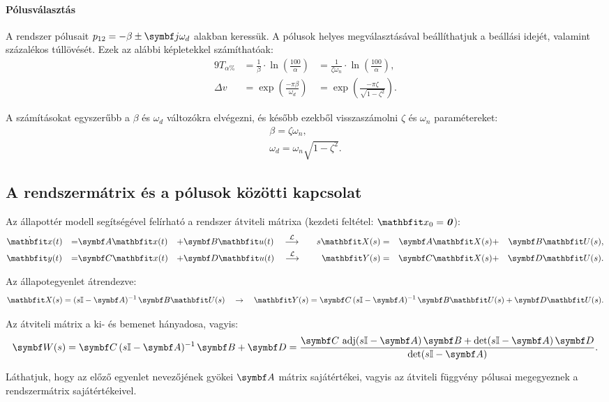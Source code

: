 \paragraph{Pólusválasztás} A rendszer pólusait $p_{12} = -\beta \pm \iu
  \omega_d$ alakban keressük. A pólusok helyes megválasztásával beállíthatjuk
a beállási idejét, valamint százalékos túllövését. Ezek az alábbi képletekkel
számíthatóak:
\begin{alignat}{9}
  T_{\alpha\%}
   & = \frac{1}{\beta} \cdot \ln \left( \frac{100}{\alpha} \right)
   & = \frac{1}{\zeta \omega_n} \cdot \ln \left( \frac{100}{\alpha} \right),
  \\[2mm]
  \Delta v
   & = \exp \left( \frac{-\pi \beta}{\omega_{d}} \right)
   & = \exp \left( \frac{-\pi \zeta}{\sqrt{1 - \zeta^2}} \right).
\end{alignat}

A számításokat egyszerűbb a $\beta$ és $\omega_d$ változókra elvégezni, és
később ezekből visszaszámolni $\zeta$ és $\omega_n$ paramétereket:
\begin{gather}
  \beta = \zeta \omega_n,
  \\
  \omega_d = \omega_n \sqrt{1 - \zeta^2}.
\end{gather}

\subsection{A rendszermátrix és a pólusok közötti kapcsolat}

Az állapottér modell segítségével felírható a rendszer átviteli mátrixa
(kezdeti feltétel: $\rvec x_0 = \nvec$):
\begin{alignat}{9}
   & \dot{\rvec x} (t) & = & \rmat A \rvec x(t) & + & \rmat B \rvec u(t)
  \quad \overset{\mathcal L}{\longrightarrow} \quad
   & s \rvec X(s)      & = & \rmat A \rvec X(s) & + & \rmat B \rvec U(s)
  ,
  \\
   & \rvec y(t)        & = & \rmat C \rvec x(t) & + & \rmat D \rvec u(t)
  \quad \overset{\mathcal L}{\longrightarrow} \quad
   & \rvec Y(s)        & = & \rmat C \rvec X(s) & + & \rmat D \rvec U(s)
  .
\end{alignat}

Az állapotegyenlet átrendezve:
\begin{equation}
  \rvec X(s) = (s\Imat - \rmat A)^{-1} \, \rmat B \rvec U(s)
  \quad \rightarrow \quad
  \rvec Y(s)
  = \rmat C \, (s\Imat - \rmat A)^{-1} \, \rmat B \rvec U(s)
  + \rmat D \rvec U(s)
  .
  \label{eq:SSM-S1}
\end{equation}

Az átviteli mátrix a ki- és bemenet hányadosa, vagyis:
\begin{equation}
  \rmat W(s)
  = \rmat C \, (s\Imat  - \rmat A)^{-1} \, \rmat B + \rmat D
  = \frac{
    \rmat C \, \adj(s\Imat  - \rmat A) \, \rmat B
    + \det(s\Imat - \rmat A) \, \rmat D
  }{\det (s\Imat - \rmat A)}
  .
  \label{eq:SSM-W}
\end{equation}

Láthatjuk, hogy az előző egyenlet nevezőjének gyökei $\rmat A$ mátrix
sajátértékei, vagyis az átviteli függvény pólusai megegyeznek a rendszermátrix
sajátértékeivel.
